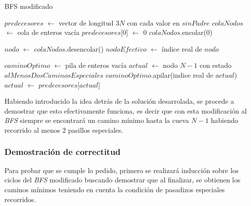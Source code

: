     \begin{algorithm}
        \caption{BFS modificado}
        \label{algo:bfs}

        $predecesores$ $\gets$ vector de longitud $3N$ con cada valor en $sinPadre$ \;
        $colaNodos$ $\gets$ cola de enteros vacía \;
        $predecesores$[$0$] $\gets$ $0$ \;
        $colaNodos$.encolar($0$) \;

         {
            $nodo$ $\gets$ $colaNodos$.desencolar() \;
            $nodoEfectivo$ $\gets$ índice real de $nodo$ \;
        }

        $caminoOptimo$ $\gets$ pila de enteros vacía \;
        $actual$ $\gets$ nodo $N - 1$ con estado $alMenosDosCaminosEspeciales$ \;
         {
            $caminoOptimo$.apilar(indice real de $actual$) \;
            $actual$ $\gets$ $predecesores$[$actual$] \;
        }
    \end{algorithm}

	Habiendo introducido la idea detrás de la solución desarrolada, se procede a
	demostrar que esto efectivamente funciona, es decir que con esta
	modificación al \emph{BFS} siempre se encontrará un camino mínimo hasta la
	cueva $N - 1$ habiendo recorrido al menos 2 pasillos especiales.

	\subsubsection{Demostración de correctitud}

	Para probar que se cumple lo pedido, primero se realizará inducción sobre los ciclos
	del \emph{BFS} modificado buscando demostrar que al finalizar, se obtienen
	los caminos mínimos teniendo en cuenta la condición de pasadizos especiales
	recorridos.

